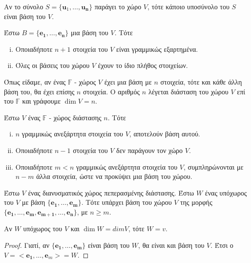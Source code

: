 \documentclass[a4paper,table]{report}
\begin{document}
\begin{prop}
  Αν το σύνολο $ S = \{ \mathbf{u}_{1}, \ldots, \mathbf{u_{n}} \} $ παράγει 
  το χώρο $V$, τότε κάποιο υποσύνολο του $S$ είναι βάση του $V$.
\end{prop}

\begin{thm}
  Έστω $ B = \{ \mathbf{e_{1}}, \ldots, \mathbf{e_{n}} \} $ μια βάση του $V$. 
  Τότε 
  \begin{enumerate}[i)]
    \item Οποιαδήποτε $ n+1 $ στοιχεία του $V$ είναι γραμμικώς εξαρτημένα.
    \item Όλες οι βάσεις του χώρου $V$ έχουν το ίδιο πλήθος στοιχείων.
  \end{enumerate}
\end{thm}

\begin{dfn}
  Όπως είδαμε, αν ένας $ \mathbb{F} $ - χώρος $V$ έχει μια βάση με 
  $ n $ στοιχεία, τότε και κάθε άλλη βάση του, θα έχει επίσης $n$ στοιχεία. 
  Ο αριθμός $n$ λέγεται \textcolor{Col2}{διάσταση} του χώρου $V$ επί του 
  $ \mathbb{F} $ και γράφουμε $ \dim V = n $.
\end{dfn}

\begin{prop}
\item {}
  Έστω $V$ ένας $ \mathbb{F} $ - χώρος διάστασης $n$. Τότε
  \begin{enumerate}[i)]
    \item $n$ γραμμικώς ανεξάρτητα στοιχεία του $V$, αποτελούν βάση αυτού.
    \item Οποιαδήποτε $ n-1 $ στοιχεία του $V$ δεν παράγουν τον χώρο $V$.
    \item Οποιαδήποτε $ m < n $ γραμμικώς ανεξάρτητα στοιχεία του $V$, 
      συμπληρώνονται με $ n-m $ άλλα στοιχεία, ώστε να προκύψει μια 
      βάση του χώρου.
  \end{enumerate}
\end{prop}

\begin{prop}
  Έστω $V$ ένας διανυσματικός χώρος πεπερασμένης διάστασης. Έστω $ W $ ένας 
  υπόχωρος του $V$ με βάση $ \{ \mathbf{e_{1}}, \ldots, \mathbf{e_{m}} \} $. 
  Τότε υπάρχει βάση του χώρου $ V $ της μορφής 
  $ \{ \mathbf{e_{1}}, \ldots, \mathbf{e_{m}}, \mathbf{e_{m+1}}, \ldots, 
  \mathbf{e_{n}} \} $, με $ n \geq m $.
\end{prop}

\begin{prop}
  Αν $W$ υπόχωρος του $V$ και $ \dim W = dim V $, τότε $ W=v $.
\end{prop}
\begin{proof}
  Γιατί, αν $ \{ \mathbf{e_{1}}, \ldots, \mathbf{e_{m}}\}  $ είναι βάση του 
  $ W $, θα είναι και βάση του $V$. Έτσι ο 
  $ V = < \mathbf{e_{1}}, \ldots, \mathbf{e}_{m} > = W$.
\end{proof}
\end{document}
